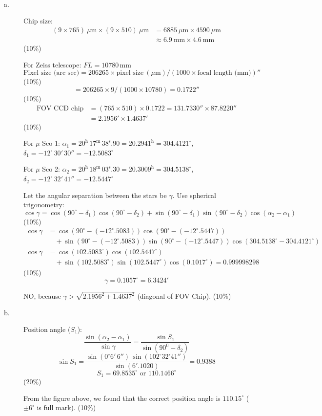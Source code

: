 \begin{description}
\item[a.] Chip size:
\begin{align*}
(9 \times 765)\ \mu\mathrm{m} \times (9 \times 510)\ \mu\mathrm{m}
&= 6885\ \mu\mathrm{m} \times 4590\ \mu\mathrm{m}\\
&\approx 6.9\ \mathrm{mm} \times 4.6\ \mathrm{mm}
\end{align*}
\hfill(10\%)

For Zeiss telescope: $FL = 10780$\,mm
\[
\text{Pixel size (arc sec)}
 = 206265 \times \text{pixel size}\ (\mu\mathrm{m})
   /(1000 \times \text{focal length (mm)})''
\]
\hfill(10\%)
\[
 = 206265 \times 9/(1000 \times 10780) = 0.1722''
\]
\hfill(10\%)
\begin{align*}
\text{FOV CCD chip} &= (765 \times 510) \times 0.1722
  = 131.7330'' \times 87.8220''\\
&= 2.1956' \times 1.4637'
\end{align*}
\hfill(10\%)

For $\mu$ Sco 1: $\alpha_1 = 20^{\mathrm{h}}\,17^{\mathrm{m}}\,38^{\mathrm{s}}.90
  = 20.2941^{\mathrm{h}} = 304.4121^\circ$,\quad
$\delta_1 = -12^\circ\,30'\,30'' = -12.5083^\circ$

For $\mu$ Sco 2: $\alpha_2 = 20^{\mathrm{h}}\,18^{\mathrm{m}}\,03^{\mathrm{s}}.30
  = 20.3009^{\mathrm{h}} = 304.5138^\circ$,\quad
$\delta_2 = -12^\circ\,32'\,41'' = -12.5447^\circ$

Let the angular separation between the stars be $\gamma$.
Use spherical trigonometry:
\[
\cos\gamma = \cos(90^\circ - \delta_1)\cos(90^\circ - \delta_2)
 + \sin(90^\circ - \delta_1)\sin(90^\circ - \delta_2)\cos(\alpha_2 - \alpha_1)
\]
\hfill(10\%)
\begin{align*}
\cos\gamma &= \cos(90^\circ - (-12^\circ.5083))\cos(90^\circ - (-12^\circ.5447))\\
&\quad + \sin(90^\circ - (-12^\circ.5083))\sin(90^\circ - (-12^\circ.5447))
   \cos(304.5138^\circ - 304.4121^\circ)\\
\cos\gamma &= \cos(102.5083^\circ)\cos(102.5447^\circ)\\
&\quad + \sin(102.5083^\circ)\sin(102.5447^\circ)\cos(0.1017^\circ)
 = 0.999998298
\end{align*}
\hfill(10\%)
\[
\gamma = 0.1057^\circ = 6.3424'
\]

NO, because $\gamma > \sqrt{2.1956^2 + 1.4637^2}$ (diagonal of FOV Chip).
\hfill(10\%)

\item[b.] Position angle ($S_1$):
\[
\frac{\sin(\alpha_2 - \alpha_1)}{\sin\gamma}
 = \frac{\sin S_1}{\sin(90^0 - \delta_2)}
\]
\[
\sin S_1 = \frac{\sin(0^\circ 6'\,6'')\,\sin(102^\circ 32'41'')}{\sin(6'.1020)}
 = 0.9388
\]
\[
S_1 = 69.8535^\circ \text{ or } 110.1466^\circ
\]
\hfill(20\%)

From the figure above, we found that the correct position angle is
$110.15^\circ$ ($\pm 6^\circ$ is full mark). \hfill(10\%)
\end{description}

